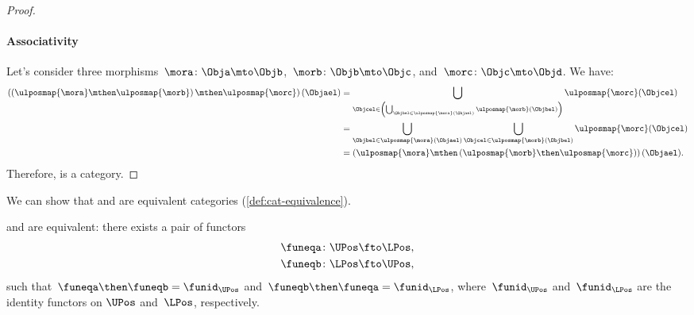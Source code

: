 \begin{proof}
\paragraph*{Associativity} Let's consider three morphisms~$\mora\colon \Obja \mto \Objb$,~$\morb\colon \Objb\mto \Objc$, and~$\morc\colon \Objc\mto \Objd$.
We have:
\begin{equation*}
    \begin{aligned}
    \left( \left( \ulposmap{\mora} \mthen \ulposmap{\morb}\right)\mthen\ulposmap{\morc}\right)(\Objael)&=
    \bigcup_{\Objcel \in \left( \bigcup_{\Objbel \in \ulposmap{\mora}(\Objael)}\ulposmap{\morb}(\Objbel)\right)}\ulposmap{\morc}(\Objcel)\\
    &=\bigcup_{\Objbel\in \ulposmap{\mora}(\Objael)}\bigcup_{\Objcel\in \ulposmap{\morb}(\Objbel)}\ulposmap{\morc}(\Objcel)\\
    &=\left( \ulposmap{\mora} \mthen \left( \ulposmap{\morb}\then \ulposmap{\morc}\right)\right)(\Objael).
    \end{aligned}
\end{equation*}
Therefore, \UPos is a category.
\end{proof}



We can show that \UPos and \LPos are equivalent categories (\cref{def:cat-equivalence}).

\begin{lemma}
\label{lem:ulposequiv}
\UPos and \LPos are equivalent: there exists a pair of functors
\begin{equation}
    \begin{aligned}
    \funeqa\colon \UPos&\fto \LPos,\\
    \funeqb\colon \LPos&\fto \UPos,
    \end{aligned}
\end{equation}
such that~$\funeqa \then \funeqb=\funid_{\UPos}$ and~$\funeqb \then \funeqa=\funid_{\LPos}$, where~$\funid_{\UPos}$ and~$\funid_{\LPos}$ are the identity functors on $\UPos$ and~$\LPos$, respectively.
\end{lemma}

